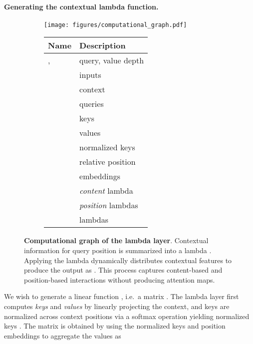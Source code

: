\documentclass{article} \usepackage{iclr2021_conference,times}
\begin{document}
\paragraph{Generating the contextual lambda function.}
\begin{figure}[t]
    \begin{subfigure}{0.65\textwidth}
        \texttt{[image: figures/computational\_graph.pdf]}
        \label{fig:lambda_layer_computational_graph}
    \end{subfigure} \hspace{-0.05\textwidth}
    \begin{subfigure}{0.35\textwidth}
		\centering
        \tiny
        \begin{tabular}{ll}
        \toprule
        Name & Description \\
        \midrule
        ,  & query, value depth \\
        \midrule
         & inputs \\
         & context \\
        \midrule
         & queries \\
         & keys \\
         & values \\
 & normalized keys \\
        \multirow{2}{*}{} & relative position \\
        & embeddings \\
        \midrule
         & \emph{content} lambda \\
         & \emph{position} lambdas \\
         & lambdas \\
        \bottomrule
        \end{tabular}
        \label{tab:lambda_layer_quantities}
    \end{subfigure}
    \caption{
    \textbf{Computational graph of the lambda layer}. 
    Contextual information for query position  is summarized into a lambda .
    Applying the lambda dynamically distributes contextual features to produce the output as .
    This process captures content-based and position-based interactions without producing attention maps.}
    \label{fig:lambda_layer_graph}
\end{figure}

We wish to generate a linear function , i.e.\ a matrix .
The lambda layer first computes \emph{keys}  and \emph{values}  by linearly projecting the context, and keys are normalized across context positions via a softmax operation yielding normalized keys .
The  matrix is obtained by using the normalized keys  and position embeddings  to aggregate the values  as
\end{document}
